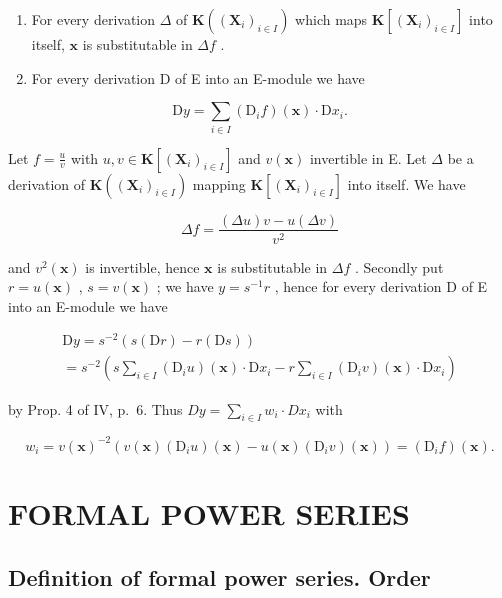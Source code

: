 \begin{enumerate}
\def\labelenumi{(\roman{enumi})}
\item
  For every derivation \(\Delta\) of \(\mathbf{K}((\mathbf{X}_i)_{i\in I})\) which maps \(\mathbf{K}[(\mathbf{X}_i)_{i\in I}]\) into itself, \(\mathbf{x}\) is substitutable in \(\Delta f\) .
\item
  For every derivation D of E into an E-module we have
\end{enumerate}

\[
\mathrm{D} y = \sum_ {i \in I} (\mathrm{D} _ {i} f) (\mathbf {x}) \cdot \mathrm{D} x _ {i}.
\]

Let \(f = \frac{u}{v}\) with \(u, v \in \mathbf{K}[(\mathbf{X}_i)_{i \in I}]\) and \(v(\mathbf{x})\) invertible in E. Let \(\Delta\) be a derivation of \(\mathbf{K}((\mathbf{X}_i)_{i \in I})\) mapping \(\mathbf{K}[(\mathbf{X}_i)_{i \in I}]\) into itself. We have

\[
\Delta f = \frac {(\Delta u) v - u (\Delta v)}{v ^ {2}}
\]

and \(v^2(\mathbf{x})\) is invertible, hence \(\mathbf{x}\) is substitutable in \(\Delta f\) . Secondly put \(r = u(\mathbf{x})\) , \(s = v(\mathbf{x})\) ; we have \(y = s^{-1}r\) , hence for every derivation D of E into an E-module we have

\[
\begin{array}{l} \mathrm{D} y = s ^ {- 2} (s (\mathrm{D} r) - r (\mathrm{D} s)) \\ = s ^ {- 2} \left(s \sum_ {i \in I} (\mathrm{D} _ {i} u) (\mathbf {x}) \cdot \mathrm{D} x _ {i} - r \sum_ {i \in I} (\mathrm{D} _ {i} v) (\mathbf {x}) \cdot \mathrm{D} x _ {i}\right) \end{array}
\]

by Prop. 4 of IV, p.~6. Thus \(Dy = \sum_{i \in I} w_i \cdot Dx_i\) with

\[
w _ {i} = v (\mathbf {x}) ^ {- 2} (v (\mathbf {x}) \left(\mathrm{D} _ {i} u\right) (\mathbf {x}) - u (\mathbf {x}) \left(\mathrm{D} _ {i} v\right) (\mathbf {x})) = \left(\mathrm{D} _ {i} f\right) (\mathbf {x}).
\]

\section{FORMAL POWER SERIES}

\subsection{Definition of formal power series. Order}

